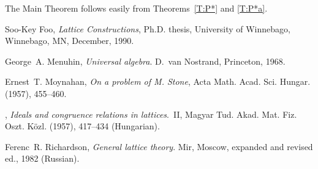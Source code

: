 \documentclass{amsart}
\theoremstyle{plain}
\theoremstyle{definition}
\theoremstyle{remark}
\numberwithin{equation}{section}
\begin{document}
The Main Theorem follows easily from Theorems~\ref{T:P*} and 
\ref{T:P*a}.

\begin{thebibliography}{9}

      Soo-Key Foo, \emph{Lattice Constructions}, Ph.D. thesis, 
      University of Winnebago, Winnebago, MN, December, 1990.

      George~A. Menuhin, \emph{Universal algebra}. D.~van 
      Nostrand, Princeton, 1968.

      Ernest~T. Moynahan, \emph{On a problem of M. Stone}, 
      Acta Math. Acad. Sci. Hungar.  (1957), 455--460.

     \bysame, \emph{Ideals and congruence relations in 
     lattices}.~II, Magyar Tud. Akad. Mat. Fiz. Oszt. K\"{o}zl. 
      (1957), 417--434  (Hungarian).

      Ferenc~R. Richardson, \emph{General lattice theory}. Mir, 
      Moscow, expanded and revised ed., 1982 (Russian).

\end{thebibliography}
\end{document}
